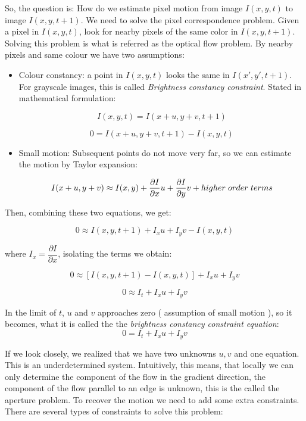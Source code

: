 So, the question is: How do we estimate pixel motion from image $I(x,y,t)$ to image $I(x,y,t+1)$. We need to solve the pixel correspondence problem. Given a pixel in $I(x,y,t)$, look for nearby pixels of the same color in $I(x,y,t+1)$. Solving this problem is what is referred as the optical flow problem. By nearby pixels and same colour we have two assumptions:

\begin{itemize}

\item Colour constancy: a point in $I(x,y,t)$ looks the same in $I(x',y',t+1)$. For grayscale images, this is called \textit{Brightness constancy constraint}. Stated in mathematical formulation:

$$ I(x,y,t) = I(x+u,y+v,t+1) $$

$$ 0 = I(x+u,y+v,t+1)-I(x,y,t)  $$

\item Small motion: Subsequent points do not move very far, so we can estimate the motion by Taylor expansion: 

$$ I(x+u,y+v) 	\approx  I(x,y) + \dfrac{ \partial I}{\partial x}u +\dfrac{ \partial I}{\partial y}v + higher \hspace{0.1cm} order \hspace{0.1cm} terms $$


\end{itemize}
 
Then, combining these two equations, we get:

$$ 0 	\approx  I(x,y,t+1) + I_{x}u +I_{y}v - I(x,y,t) $$

where $I_{x} =  \dfrac{ \partial I}{\partial x}$, isolating the terms we obtain:

$$ 0 	\approx [I(x,y,t+1) - I(x,y,t)] + I_{x}u +I_{y}v $$

$$ 0 	\approx I_{t} + I_{x}u +I_{y}v $$

In the limit of $t$, $u$ and $v$ approaches zero ( assumption of small motion ), so it becomes, what it is called the the \textit{brightness constancy constraint equation}:
$$ 0 	= I_{t} + I_{x}u +I_{y}v $$

If we look closely, we realized that we have two unknowns $u,v$ and one equation. This is an underdetermined system. Intuitively, this means, that locally we can only determine the component of the flow in the gradient direction, the component of the flow parallel to an edge is unknown, this is the called the aperture problem. To recover the motion we need to add some extra constraints. There are several types of constraints to solve this problem:


